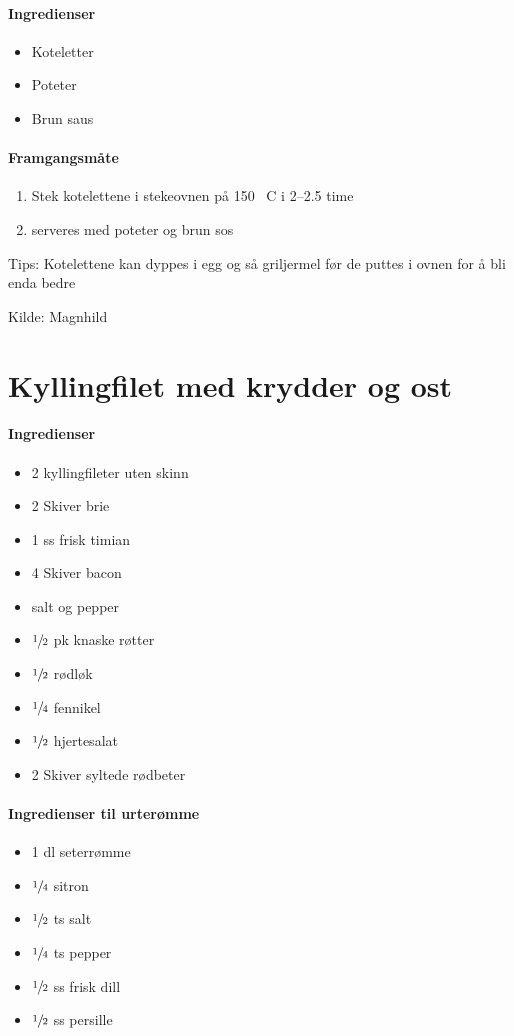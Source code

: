 \documentclass[12pt,a4paper]{book}
\begin{document}
\paragraph{Ingredienser}
\begin{itemize}[noitemsep]
	\item Koteletter
	\item Poteter
	\item Brun saus
\end{itemize}

\paragraph{Framgangsmåte}
\begin{enumerate}[noitemsep]
	\item Stek kotelettene i stekeovnen på 150 \degree~C i 2--2.5 time
	\item serveres med poteter og brun sos
\end{enumerate}

Tips: Kotelettene kan dyppes i egg og så griljermel før de puttes i ovnen for å bli enda bedre

Kilde: Magnhild
\clearpage{}
\clearpage{}\section{﻿Kyllingfilet med krydder og ost}


\paragraph{Ingredienser}
\begin{itemize}[noitemsep]
	\item 2 kyllingfileter uten skinn
	\item 2 Skiver  brie
	\item 1 ss frisk timian
	\item 4 Skiver bacon
	\item salt og pepper
	\item $\sfrac{1}{2}$  pk knaske røtter
	\item $\sfrac{1}{2}$  rødløk
	\item $\sfrac{1}{4}$  fennikel
	\item $\sfrac{1}{2}$  hjertesalat
	\item 2 Skiver syltede rødbeter
\end{itemize}

\paragraph{Ingredienser til urterømme}
\begin{itemize}[noitemsep]
	\item 1 dl seterrømme
	\item $\sfrac{1}{4}$  sitron
	\item $\sfrac{1}{2}$  ts salt
	\item $\sfrac{1}{4}$  ts pepper
	\item $\sfrac{1}{2}$  ss frisk dill
	\item $\sfrac{1}{2}$  ss persille
\end{itemize}
\end{document}
